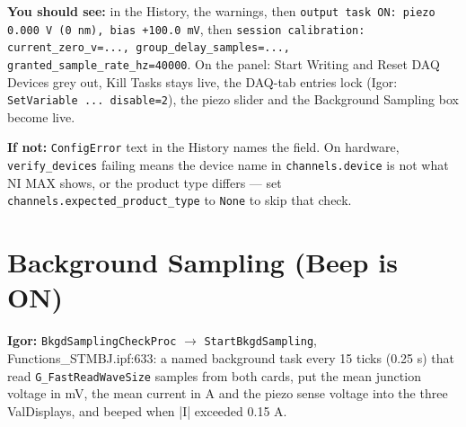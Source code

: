 \textbf{You should see:} in the History, the warnings, then \texttt{output task ON: piezo 0.\discretionary{}{}{}000 V (0 nm),\discretionary{}{}{} bias +100.\discretionary{}{}{}0 m\discretionary{}{}{}V}, then \texttt{session calibration: current\_\discretionary{}{}{}zero\_\discretionary{}{}{}v=.\discretionary{}{}{}.\discretionary{}{}{}.\discretionary{}{}{},\discretionary{}{}{} group\_\discretionary{}{}{}delay\_\discretionary{}{}{}samples=.\discretionary{}{}{}.\discretionary{}{}{}.\discretionary{}{}{},\discretionary{}{}{} granted\_\discretionary{}{}{}sample\_\discretionary{}{}{}rate\_\discretionary{}{}{}hz=40000}. On the panel: Start Writing and Reset DAQ Devices grey out, Kill Tasks stays live, the DAQ-tab entries lock (Igor: \texttt{Set\discretionary{}{}{}Variable .\discretionary{}{}{}.\discretionary{}{}{}.\discretionary{}{}{} disable=2}), the piezo slider and the Background Sampling box become live.

\textbf{If not:} \texttt{Config\discretionary{}{}{}Error} text in the History names the field. On hardware, \texttt{verify\_\discretionary{}{}{}devices} failing means the device name in \texttt{channels.\discretionary{}{}{}device} is not what NI MAX shows, or the product type differs --- set \texttt{channels.\discretionary{}{}{}expected\_\discretionary{}{}{}product\_\discretionary{}{}{}type} to \texttt{None} to skip that check.

\section{Background Sampling (Beep is ON)}

\textbf{Igor:} \texttt{Bkgd\discretionary{}{}{}Sampling\discretionary{}{}{}Check\discretionary{}{}{}Proc} $\rightarrow$ \texttt{Start\discretionary{}{}{}Bkgd\discretionary{}{}{}Sampling}, Functions\_STMBJ.ipf:633: a named background task every 15 ticks (0.25 s) that read \texttt{G\_\discretionary{}{}{}Fast\discretionary{}{}{}Read\discretionary{}{}{}Wave\discretionary{}{}{}Size} samples from both cards, put the mean junction voltage in mV, the mean current in \textmu{}A and the piezo sense voltage into the three ValDisplays, and beeped when |I| exceeded 0.15 \textmu{}A.

